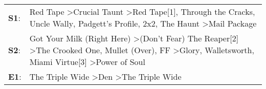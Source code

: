 \begin{supertabular}{p{0.03\textwidth}p{0.92\textwidth}}
 \textbf{S1}:  &                                       Red Tape\textsuperscript{} \textgreater \enspace Crucial Taunt\textsuperscript{} \textgreater \enspace Red Tape[1]\textsuperscript{}, \enspace Through the Cracks\textsuperscript{}, \enspace Uncle Wally\textsuperscript{}, \enspace Padgett's Profile\textsuperscript{}, \enspace 2x2\textsuperscript{}, \enspace The Haunt\textsuperscript{} \textgreater \enspace Mail Package\textsuperscript{}  \enspace  \\
 \textbf{S2}:  &  Got Your Milk (Right Here)\textsuperscript{} \textgreater \enspace (Don't Fear) The Reaper[2]\textsuperscript{} \textgreater \enspace The Crooked One\textsuperscript{}, \enspace Mullet (Over)\textsuperscript{}, \enspace FF\textsuperscript{} \textgreater \enspace Glory\textsuperscript{}, \enspace Walletsworth\textsuperscript{}, \enspace Miami Virtue[3]\textsuperscript{} \textgreater \enspace Power of Soul\textsuperscript{}  \enspace  \\
 \textbf{E1}:  &                                                                                                                                                                                                                                                                                                      The Triple Wide\textsuperscript{} \textgreater \enspace Den\textsuperscript{} \textgreater \enspace The Triple Wide\textsuperscript{}  \enspace  \\
\end{supertabular}

